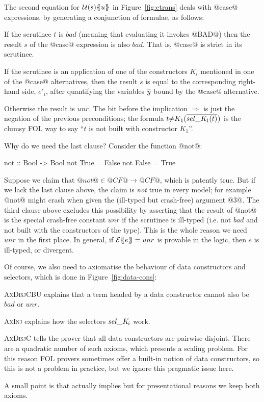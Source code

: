 The second equation for $\utrans{}{u}{s}$ in Figure~\ref{fig:etrans} deals with
@case@ expressions, by generating a conjunction of formulae, as follows:
\begin{itemize*}
\item If the scrutinee $t$ is $bad$ (meaning that evaluating it invokes @BAD@) then
the result $s$ of the @case@ expression is also $bad$.  That is, @case@ is strict in
its scrutinee.
\item If the scrutinee is an application of one of the constructors $K_i$ mentioned
in one of the @case@ alternatives, then the result $s$ is equal to the corresponding
right-hand side, $e'_i$, after quantifying the variables $\ol{y}$ bound by the @case@ alternative.
\item Otherwise the result is $unr$.
The bit before the implication $\Rightarrow$ is just the
negation of the previous preconditions; the formula
  $t{\neq}K_1(\oln{{\sel{K}{1}}(t)}{})$
is the clumsy FOL way to say ``$t$ is not built with constructor $K_1$''.
\end{itemize*}
Why do we need the last clause? Consider the function @not@:
\begin{code}
  not :: Bool -> Bool
  not True = False
  not False = True
\end{code}
Suppose we claim that $@not@ \in @CF@ \rightarrow @CF@$, which is patently true.
But if we lack the last clause above, the claim 
is \emph{not} true in every model;
for example @not@ might crash when given the (ill-typed but crash-free) 
argument @3@.  The third clause above excludes this possibility by
asserting that the result of @not@ is the special crash-free constant $unr$
if the scrutinee is ill-typed (i.e. not $bad$ and not built with the 
constructors of the type).  This is the whole reason we need $unr$ in the first place.
In general, if $\etrans{}{}{e} = unr$ is provable in the logic, then $e$ is ill-typed, 
or divergent.

Of course, we also need to axiomatise the behaviour of data constructors and
selectors, which is done in Figure~\ref{fig:data-cons}:
\begin{itemize*}
\item \textsc{AxDisjCBU} explains that a term headed by a data constructor cannot
also be $bad$ or $unr$.
\item \textsc{AxInj} explains how the selectors $\sel{K}{i}$ work.
\item \textsc{AxDisjC} tells the prover that all data constructors are pairwise disjoint.
There are a quadratic number of such axioms, which presents a scaling problem.
For this reason FOL provers sometimes offer a built-in notion of data constructors,
so this is not a problem in practice, but we ignore this pragmatic issue here.
\end{itemize*}
A small point is that  actually implies  but for 
presentational reasons we keep both axioms.

